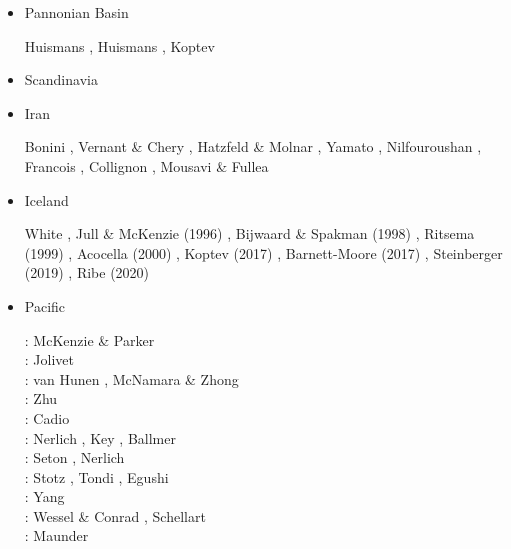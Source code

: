 \begin{itemize}
\item Pannonian Basin 

\begin{scriptsize}
Huismans \etal \cite{hupc01b},
Huismans \etal \cite{hupc02},
Koptev \etal \cite{kock21}
\end{scriptsize}

\item Scandinavia  
{\scriptsize
\cite{ramb80}
\cite{bovc14}
}
\item Iran

\begin{scriptsize}
Bonini \etal \cite{bocs03},
Vernant \&  Chery \cite{vech06},
Hatzfeld \& Molnar \cite{hamo10},
Yamato \etal \cite{yakm11},
Nilfouroushan \etal \cite{nipc13},
Francois \etal \cite{frba14},
Collignon \etal \cite{coyc16},
Mousavi \& Fullea \cite{mofu20}
\end{scriptsize} 
 

\item Iceland

\begin{scriptsize}
White \cite{whit89},
Jull \& McKenzie (1996) \cite{jumc96},
Bijwaard \& Spakman  (1998) \cite{bisp98},
Ritsema \etal (1999) \cite{rivw99},
Acocella \etal  (2000) \cite{acgf00},
Koptev \etal (2017) \cite{kocb17},
Barnett-Moore \etal (2017) \cite{bahf17},
Steinberger \etal (2019) \cite{stbl19},
Ribe \etal (2020) \cite{rits20}
\end{scriptsize} 

\item Pacific 

\begin{scriptsize}
\nineteensixtyseven: McKenzie \& Parker \cite{mcpa67}\\
\nineteenninety: Jolivet \etal \cite{jodc90}\\
\twothousandfive: van Hunen \etal \cite{vazs05}, McNamara \& Zhong \cite{mczh05a}\\
\twothousandten: Zhu \etal \cite{zhst10}\\
\twothousandeleven: Cadio \etal \cite{capd11}\\
\twothousandthirteen: Nerlich \etal \cite{necb13}, Key \etal \cite{kecl13}, Ballmer \etal \cite{bacs13}\\
\twothousandfifteen: Seton \etal \cite{sefw15}, Nerlich \etal \cite{necb15}\\
\twothousandseventeen: Stotz \etal \cite{stid17}, Tondi \etal \cite{togr17}, Egushi \cite{egim17}\\
\twothousandeighteen: Yang \etal \cite{yamz18}\\
\twothousandnineteen: Wessel \& Conrad \cite{weco19}, Schellart \etal \cite{sccs19}\\
\twothousandtwenty: Maunder \cite{mapg20}
\end{scriptsize}




\end{itemize}
